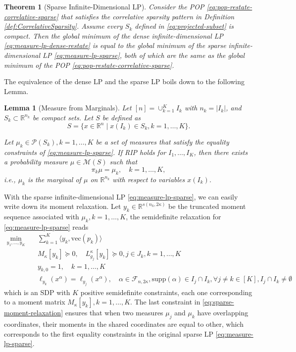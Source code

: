\documentclass[
]{book}
\newtheorem{theorem}{Theorem}[chapter]
\newtheorem{lemma}{Lemma}[chapter]
\theoremstyle{definition}
\theoremstyle{definition}
\theoremstyle{definition}
\theoremstyle{definition}
\theoremstyle{remark}
\begin{document}
\begin{theorem}[Sparse Infinite-Dimensional LP]
\protect\hypertarget{thm:SparseInfDimLP}{}\label{thm:SparseInfDimLP}Consider the POP \eqref{eq:pop-restate-correlative-sparse} that satisfies the correlative sparsity pattern in Definition \ref{def:CorrelativeSparsity}. Assume every \(S_k\) defined in \eqref{eq:projected-subset} is compact. Then the global minimum of the dense infinite-dimensional LP \eqref{eq:measure-lp-dense-restate} is equal to the global minimum of the sparse infinite-dimensional LP \eqref{eq:measure-lp-sparse}, both of which are the same as the global minimum of the POP \eqref{eq:pop-restate-correlative-sparse}.
\end{theorem}

The equivalence of the dense LP and the sparse LP boils down to the following Lemma.

\begin{lemma}[Measure from Marginals]
\protect\hypertarget{lem:MeasureFromMarginals}{}\label{lem:MeasureFromMarginals}Let \([n] = \cup_{k=1}^K I_k\) with \(n_k = |I_k|\), and \(S_k \subset \mathbb{R}^{n_k}\) be compact sets. Let \(S\) be defined as
\[
S = \{ x \in \mathbb{R}^{n} \mid x(I_k) \in S_k, k=1,\dots,K \}.
\]

Let \(\mu_k \in \mathcal{P}(S_k),k=1,\dots,K\) be a set of measures that satisfy the equality constraints of \eqref{eq:measure-lp-sparse}. If RIP holds for \(I_1,\dots,I_K\), then there exists a probability measure \(\mu \in \mathcal{M}(S)\) such that
\[
\pi_k \mu = \mu_k, \quad k=1,\dots,K,
\]
i.e., \(\mu_k\) is the marginal of \(\mu\) on \(\mathbb{R}^{n_k}\) with respect to variables \(x(I_k)\).
\end{lemma}

With the sparse infinite-dimensional LP \eqref{eq:measure-lp-sparse}, we can easily write down its moment relaxation. Let \(y_k \in \mathbb{R}^{s(n_k,2\kappa)}\) be the truncated moment sequence associated with \(\mu_k, k=1,\dots,K\), the semidefinite relaxation for \eqref{eq:measure-lp-sparse} reads
\begin{equation}
\begin{split}
\min_{y_1,\dots,y_K} & \quad \sum_{k=1}^K \langle y_k, \mathrm{vec}(p_k) \rangle \\
& \quad M_\kappa[y_k] \succeq 0, \quad L_{g_j}^\kappa[y_k] \succeq 0, j\in J_k, k=1,\dots,K \\
& \quad y_{k,0} = 1,\quad k=1,\dots,K \\
& \quad \ell_{y_k} (x^\alpha) = \ell_{y_j} (x^\alpha), \quad \alpha \in \mathcal{F}_{n,2\kappa}, \mathrm{supp}(\alpha) \in I_j \cap I_k, \forall j \neq k \in [K], I_j \cap I_k \neq \emptyset
\end{split}
\label{eq:sparse-moment-relaxation}
\end{equation}
which is an SDP with \(K\) positive semidefinite constraints, each one corresponding to a moment matrix \(M_{\kappa}[y_k],k=1,\dots,K\). The last constraint in \eqref{eq:sparse-moment-relaxation} ensures that when two measures \(\mu_j\) and \(\mu_k\) have overlapping coordinates, their moments in the shared coordinates are equal to other, which corresponds to the first equality constraints in the original sparse LP \eqref{eq:measure-lp-sparse}.
\end{document}
